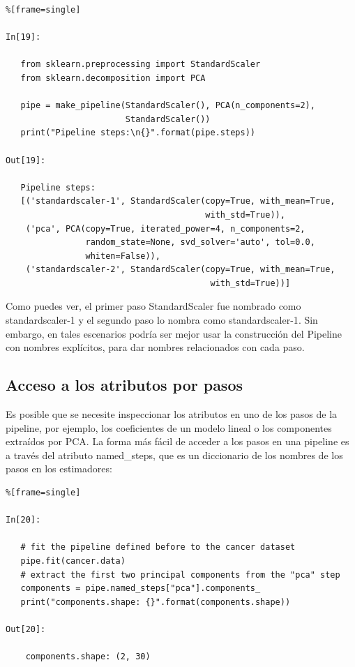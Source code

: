 	\begin{lstlisting}%[frame=single]
   
In[19]:
   
   from sklearn.preprocessing import StandardScaler
   from sklearn.decomposition import PCA
   
   pipe = make_pipeline(StandardScaler(), PCA(n_components=2), 
                        StandardScaler())
   print("Pipeline steps:\n{}".format(pipe.steps))
   
Out[19]:
   
   Pipeline steps:
   [('standardscaler-1', StandardScaler(copy=True, with_mean=True,
                                        with_std=True)), 
    ('pca', PCA(copy=True, iterated_power=4, n_components=2, 
                random_state=None, svd_solver='auto', tol=0.0,
                whiten=False)), 
    ('standardscaler-2', StandardScaler(copy=True, with_mean=True, 
                                         with_std=True))]   
   \end{lstlisting}
  	
	Como puedes ver, el primer paso {\ttfamily StandardScaler} fue nombrado como  {\ttfamily standardscaler-1} y el segundo paso lo nombra como {\ttfamily standardscaler-1}. Sin embargo, en tales escenarios podría ser mejor usar la construcción del {\ttfamily Pipeline} con nombres explícitos, para dar nombres relacionados con cada paso.
	
	\subsection{Acceso a los atributos por pasos}
	
	
	Es posible que se necesite inspeccionar los atributos en uno de los pasos de la pipeline, por ejemplo, los coeficientes de un modelo lineal o los componentes extraídos por PCA. La forma más fácil de acceder a los pasos en una pipeline es a través del atributo {\ttfamily named\_steps}, que es un diccionario de los nombres de los pasos en los estimadores:	
	
	
	\begin{lstlisting}%[frame=single]
	
In[20]:
	
   # fit the pipeline defined before to the cancer dataset
   pipe.fit(cancer.data)
   # extract the first two principal components from the "pca" step
   components = pipe.named_steps["pca"].components_
   print("components.shape: {}".format(components.shape))
   
Out[20]:
   
    components.shape: (2, 30)   
	\end{lstlisting}
	
